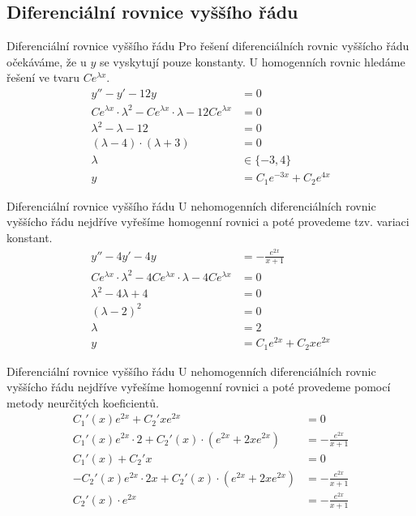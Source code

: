 \documentclass{beamer}
\theoremstyle{definition}
\theoremstyle{example}
\begin{document}
\subsection{Diferenciální rovnice vyššího řádu}
\begin{frame}{Diferenciální rovnice vyššího řádu}
	Pro řešení diferenciálních rovnic vyššícho řádu očekáváme, že u $y$ se vyskytují pouze konstanty. U homogenních rovnic hledáme řešení ve tvaru $Ce^{\lambda x}$.
	\begin{align*}
		y'' - y' - 12y &=0\\
		Ce^{\lambda x}\cdot \lambda^2 - Ce^{\lambda x}\cdot \lambda - 12 Ce^{\lambda x} &= 0\\
		\lambda^2 - \lambda - 12 &= 0\\
		(\lambda - 4) \cdot (\lambda + 3) &= 0\\
		\lambda &\in \{-3, 4\}\\
		y &= C_1e^{-3x} + C_2e^{4x}
	\end{align*}
\end{frame}

\begin{frame}{Diferenciální rovnice vyššího řádu}
	U nehomogenních diferenciálních rovnic vyššícho řádu nejdříve vyřešíme homogenní rovnici a poté provedeme tzv. variaci konstant.~\cite{isibalo}
	\begin{align*}
		y'' - 4y' - 4y &=-\frac{e^{2x}}{x + 1}\\
		Ce^{\lambda x}\cdot \lambda^2 - 4Ce^{\lambda x}\cdot \lambda - 4Ce^{\lambda x} &= 0\\
		\lambda^2 - 4\lambda + 4 &= 0\\
		(\lambda - 2)^2 &= 0\\
		\lambda &= 2\\
		y &= C_1e^{2x} + C_2xe^{2x}
	\end{align*}
\end{frame}

\begin{frame}{Diferenciální rovnice vyššího řádu}
	U nehomogenních diferenciálních rovnic vyššícho řádu nejdříve vyřešíme homogenní rovnici a poté provedeme pomocí metody neurčitých koeficientů.~\cite{isibalo}
	\begin{align*}
		C_1'(x)e^{2x} + C_2'xe^{2x} &= 0\\
		C_1'(x)e^{2x}\cdot 2 + C_2'(x)\cdot(e^{2x} + 2xe^{2x}) &= -\frac{e^{2x}}{x + 1}\\
		C_1'(x) + C_2'x &= 0\\
		-C_2'(x)e^{2x}\cdot 2x + C_2'(x)\cdot(e^{2x} + 2xe^{2x}) &= -\frac{e^{2x}}{x + 1}\\
		C_2'(x)\cdot e^{2x} &= -\frac{e^{2x}}{x + 1}
	\end{align*}
\end{frame}
\end{document}
